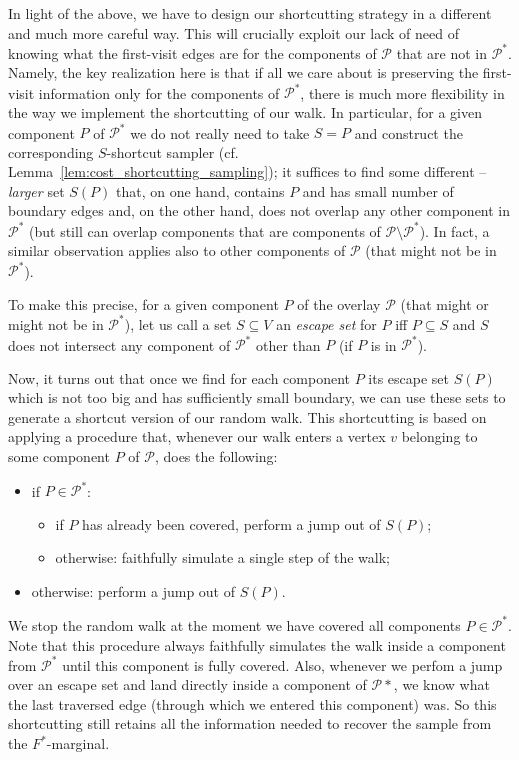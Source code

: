 \documentclass[11pt, letterpaper]{article}
\newcommand{\cP}{\mathcal{P}}
\begin{document}
In light of the above, we have to design our shortcutting strategy in a different and much more careful way. This will crucially exploit our lack of need of knowing what the first-visit edges are for the components of $\cP$ that are not in $\cP^*$. Namely, the key realization here is that if all we care about is preserving the first-visit information only for the components of $\cP^*$, there is much more flexibility in the way we implement the shortcutting of our walk. In particular, for a given component $P$ of $\cP^*$ we do not really need to take $S=P$ and construct the corresponding $S$-shortcut sampler (cf. Lemma~\ref{lem:cost_shortcutting_sampling}); it suffices to find some different -- {\em larger} set $S(P)$ that, on one hand, contains $P$ and has small number of boundary edges and, on the other hand, does not overlap any other component in $\cP^*$ (but still can overlap components that are components of $\cP\setminus \cP^*$). In fact, a similar observation applies also to other components of $\cP$ (that might not be in $\cP^*$).

To make this precise, for a given component $P$ of the overlay $\cP$ (that might or might not be in $\cP^*$), let us call a set $S\subseteq V$ an {\em escape set} for $P$ iff $P\subseteq S$ and $S$ does not intersect any component of $\cP^*$ other than $P$ (if $P$ is in $\cP^*$).

Now, it turns out that once we find for each component $P$ its escape set $S(P)$ which is not too big and has sufficiently small boundary, we can use these sets to generate a shortcut version of our random walk. This shortcutting is based on applying a procedure that, whenever our walk enters a vertex $v$ belonging to some component $P$ of $\cP$, does the following:
\begin{itemize}
	\item if $P \in \cP^*$:
	\begin{itemize}
		\item if $P$ has already been covered, perform a jump out of $S(P)$;
		\item otherwise: faithfully simulate a single step of the walk;
	\end{itemize}
	\item otherwise: perform a jump out of $S(P)$.
\end{itemize}
We stop the random walk at the moment we have covered all components $P \in \cP^*$. Note that this procedure always faithfully simulates the walk inside a component from $\cP^*$ until this component is fully covered. Also, whenever we perfom a jump over an escape set and land directly inside a component of $\cP*$, we know what the last traversed edge (through which we entered this component) was. So this shortcutting still retains all the information needed to recover the sample from the $F^*$-marginal.
\end{document}
